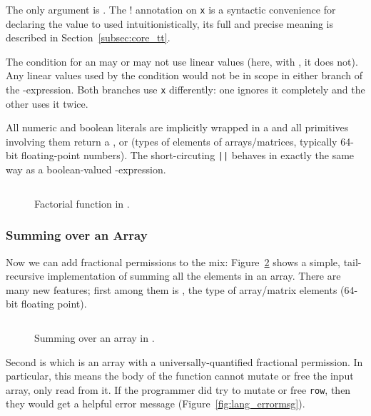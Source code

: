 The only argument is . The ! annotation on \texttt{x} is a
syntactic convenience for declaring the value to used intuitionistically, its
full and precise meaning is described in Section~\ref{subsec:core_tt}.

The condition for an  may or may not use linear values (here, with
, it does not). Any linear values used by the condition
would not be in scope in either branch of the -expression.  Both
branches use \texttt{x} differently: one ignores it completely and the other
uses it twice.

All numeric and boolean literals are implicitly wrapped in a  and
all primitives involving them return a ,  or
 (types of elements of arrays/matrices, typically 64-bit
floating-point numbers). The short-circuting \texttt{||} behaves in exactly the
same way as a boolean-valued -expression.

\begin{figure}[t]
    \centering
    \inputminted[fontsize=\small, linenos]{ocaml}{../../examples/factorial.lt}
    \caption{Factorial function in \lang.}\label{fig:lang_factorial}
\end{figure}

\subsubsection{Summing over an Array}

Now we can add fractional permissions to the mix:
Figure~\ref{fig:lang_sumarray} shows a simple, tail-recursive implementation of
summing all the elements in an array. There are many new features; first among
them is , the type of array/matrix elements (64-bit floating
point).

\begin{figure}[t]
    \centering
    \inputminted[fontsize=\small]{ocaml}{../../examples/sum_array.lt}
    \caption{Summing over an array in \lang.}\label{fig:lang_sumarray}
\end{figure}

Second is  which is an array with a
universally-quantified fractional permission. In particular, this means the
body of the function cannot mutate or free the input array, only read from it.
If the programmer did try to mutate or free \texttt{row}, then they would get a
helpful error message (Figure~\ref{fig:lang_errormsg}).

